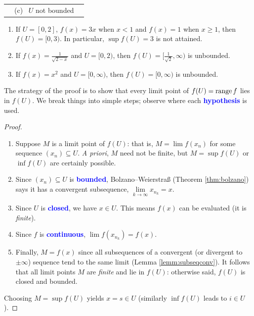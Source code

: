 \begin{examples}{}{}
\begin{enumerate}
\begin{center}
\begin{tabular}{c@{\qquad}c@{\qquad}c}
			&
			(c) \ $U$ not bounded	
		\end{tabular}
		\end{center}
		\begin{enumerate}
		  \item If $U=[0,2]$, $f(x)=3x$ when $x<1$ and $f(x)=1$ when $x\ge 1$, then $f(U)=[0,3)$. In particular, $\sup f(U)=3$ is not attained.
		  \item If $f(x)=\frac 1{\sqrt{2-x}}$ and $U=[0,2)$, then $f(U)=[\frac 1{\sqrt 2},\infty)$ is unbounded.
		  \item If $f(x)=x^2$ and $U=[0,\infty)$, then $f(U)=[0,\infty)$ is unbounded.
		\end{enumerate}
	\end{enumerate}
\end{examples}

\goodbreak

The strategy of the proof is to show that every limit point of $f(U)=\operatorname{range} f$ lies in $f(U)$. We break things into simple steps; observe where each \textcolor{blue}{\textbf{hypothesis}} is used.

\begin{proof}
	\begin{enumerate}
	  \item Suppose $M$ is a limit point of $f(U)$: that is, $M=\lim f(x_n)$ for some sequence $(x_n)\subseteq U$.	\emph{A priori}, $M$ need not be finite, but $M=\sup f(U)$ or $\inf f(U)$ are certainly possible.\footnotemark{}
		\item Since $(x_n)\subseteq U$ is \textcolor{blue}{\textbf{bounded}}, Bolzano--Weierstraß (Theorem \ref{thm:bolzano}) says it has a convergent subsequence, $\lim\limits_{k\to\infty}x_{n_k}=x$.
		\item	Since $U$ is \textcolor{blue}{\textbf{closed}}, we have $x\in U$. This means $f(x)$ can be evaluated (it is \emph{finite}).
		\item	Since $f$ is \textcolor{blue}{\textbf{continuous}}, $\lim f(x_{n_k})=f(x)$.
		\item	Finally, $M=f(x)$ since all subsequences of a convergent (or divergent to $\pm\infty$) sequence tend to the same limit (Lemma \ref{lemm:subseqconv}). It follows that all limit points $M$ are \emph{finite} and lie in $f(U)$: otherwise said, $f(U)$ is closed and bounded.
	\end{enumerate}
	\medskip
	Choosing $M=\sup f(U)$ yields $x=s\in U$ (similarly $\inf f(U)$ leads to $i\in U$).
\end{proof}

